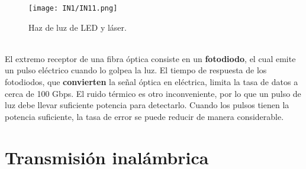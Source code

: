\documentclass[
	12pt, %
	fleqn, %
	a4paper, %
	oneside, %
]{LegrandOrangeBook}
\begin{document}
\begin{figure}[]
\centering
\texttt{[image: IN1/IN11.png]}
\caption{Haz de luz de LED y láser.}
\end{figure}
\\El extremo receptor de una fibra óptica consiste en un \textbf{fotodiodo}, el cual emite un pulso eléctrico cuando lo golpea la luz. El tiempo de respuesta de los fotodiodos, que \textbf{convierten} la señal óptica en eléctrica, limita la tasa de datos a cerca de 100 Gbps. El ruido térmico es otro inconveniente, por lo que un pulso de luz debe llevar suficiente potencia para detectarlo. Cuando los pulsos tienen la potencia suficiente, la tasa de error se puede reducir de manera considerable.
\section{Transmisión inalámbrica}
\end{document}

